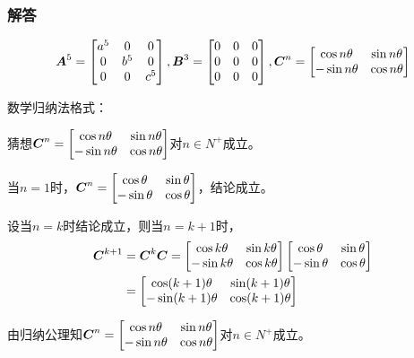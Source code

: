 \documentclass[9pt,xcolor=svgnames]{beamer} %
\begin{document}
\begin{frame}[allowframebreaks]
    \frametitle{解答}
    \begin{equation*}
        \boldsymbol{A}^5=\begin{bmatrix}a^5&0&0\\0&b^5&0\\0&0&c^5\end{bmatrix},\boldsymbol{B}^3=\begin{bmatrix}0&0&0\\0&0&0\\0&0&0\end{bmatrix},\boldsymbol{C}^n=\begin{bmatrix}\cos n\theta&\sin n\theta\\-\sin n\theta&\cos n\theta\end{bmatrix}
    \end{equation*}

    数学归纳法格式：

    猜想\(\boldsymbol{C}^n=\begin{bmatrix}\cos n\theta&\sin n\theta\\-\sin n\theta&\cos n\theta\end{bmatrix}\)对\(n\in N^+\)成立。

    当\(n=1\)时，\(\boldsymbol{C}^n=\begin{bmatrix}\cos \theta&\sin \theta\\-\sin \theta&\cos \theta\end{bmatrix}\)，结论成立。

    设当\(n=k\)时结论成立，则当\(n=k+1\)时，
    \begin{align*}
        \boldsymbol{C}^{k+1} & =\boldsymbol{C}^k\boldsymbol{C}=\begin{bmatrix}\cos k\theta&\sin k\theta\\-\sin k\theta&\cos k\theta\end{bmatrix}\begin{bmatrix}\cos \theta&\sin \theta\\-\sin \theta&\cos \theta\end{bmatrix} \\
                    & =\begin{bmatrix}\cos (k+1)\theta&\sin (k+1)\theta\\-\sin (k+1)\theta&\cos (k+1)\theta\end{bmatrix}
    \end{align*}

    由归纳公理知\(\boldsymbol{C}^n=\begin{bmatrix}\cos n\theta&\sin n\theta\\-\sin n\theta&\cos n\theta\end{bmatrix}\)对\(n\in N^+\)成立。
\end{frame}
\end{document}
